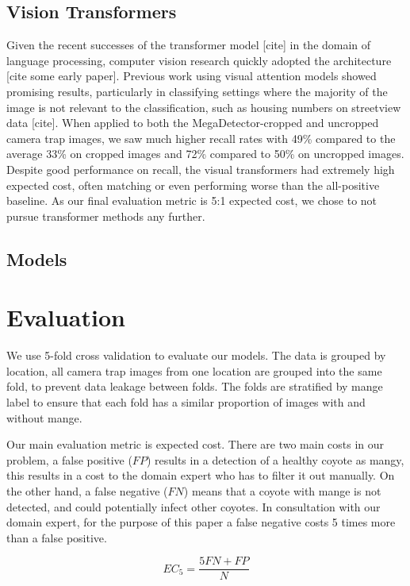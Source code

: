 \documentclass{article}
\begin{document}
\subsection{Vision Transformers}
Given the recent successes of the transformer model [cite] in the domain of
language processing, computer vision research quickly adopted the architecture
[cite some early paper].  Previous work using visual attention models showed
promising results, particularly in classifying settings where the majority of
the image is not relevant to the classification, such as housing numbers on
streetview data [cite]. When applied to both the MegaDetector-cropped and
uncropped camera trap images, we saw much higher recall rates with 49\% compared
to the average 33\% on cropped images and 72\% compared to 50\% on uncropped
images. Despite good performance on recall, the visual transformers had
extremely high expected cost, often matching or even performing worse than the
all-positive baseline. As our final evaluation metric is 5:1 expected cost, we
chose to not pursue transformer methods any further.

\subsection{Models}

\section{Evaluation} \label{sec:evaluation}
We use 5-fold cross validation to evaluate our models. The data is grouped by
location, all camera trap images from one location are grouped into the same
fold, to prevent data leakage between folds. The folds are stratified by mange
label to ensure that each fold has a similar proportion of images with and
without mange.

Our main evaluation metric is expected cost. There are two main costs in our
problem, a false positive ($FP$) results in a detection of a healthy coyote as
mangy, this results in a cost to the domain expert who has to filter it out
manually. On the other hand, a false negative ($FN$) means that a coyote with
mange is not detected, and could potentially infect other coyotes. In
consultation with our domain expert, for the purpose of this paper a false
negative costs 5 times more than a false positive.

\begin{equation}
  EC_5 = \frac{5FN + FP}{N}
\end{equation}
\end{document}

